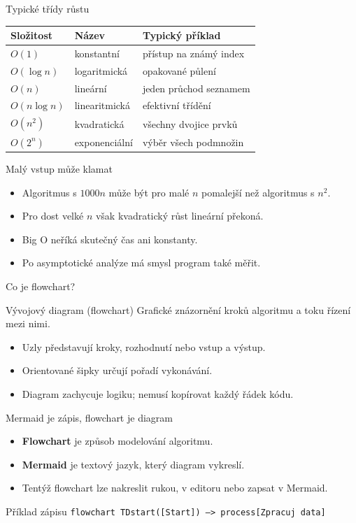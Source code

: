 \documentclass[aspectratio=169]{beamer}
\newcommand{\term}[1]{\textcolor{CodeBlue}{\textbf{#1}}}
\begin{document}
\begin{frame}{Typické třídy růstu}
  \centering
  \begin{tabular}{lll}
    \textbf{Složitost} & \textbf{Název} & \textbf{Typický příklad} \\
    \hline
    \(O(1)\) & konstantní & přístup na známý index \\
    \(O(\log n)\) & logaritmická & opakované půlení \\
    \(O(n)\) & lineární & jeden průchod seznamem \\
    \(O(n\log n)\) & linearitmická & efektivní třídění \\
    \(O(n^2)\) & kvadratická & všechny dvojice prvků \\
    \(O(2^n)\) & exponenciální & výběr všech podmnožin \\
  \end{tabular}
\end{frame}

\begin{frame}{Malý vstup může klamat}
  \begin{itemize}
    \item Algoritmus s \(1000n\) může být pro malé \(n\) pomalejší než algoritmus s \(n^2\).
    \item Pro dost velké \(n\) však kvadratický růst lineární překoná.
    \item Big O neříká skutečný čas ani konstanty.
    \item Po asymptotické analýze má smysl program také měřit.
  \end{itemize}
\end{frame}

\begin{frame}{Co je flowchart?}
  \begin{block}{Vývojový diagram (flowchart)}
    Grafické znázornění kroků algoritmu a toku řízení mezi nimi.
  \end{block}
  \begin{itemize}
    \item Uzly představují kroky, rozhodnutí nebo vstup a výstup.
    \item Orientované šipky určují pořadí vykonávání.
    \item Diagram zachycuje logiku; nemusí kopírovat každý řádek kódu.
  \end{itemize}
\end{frame}

\begin{frame}{Mermaid je zápis, flowchart je diagram}
  \begin{itemize}
    \item \term{Flowchart} je způsob modelování algoritmu.
    \item \term{Mermaid} je textový jazyk, který diagram vykreslí.
    \item Tentýž flowchart lze nakreslit rukou, v editoru nebo zapsat v Mermaid.
  \end{itemize}
  \begin{block}{Příklad zápisu}
    \texttt{flowchart TD}\qquad \texttt{start([Start]) --> process[Zpracuj data]}
  \end{block}
\end{frame}
\end{document}
